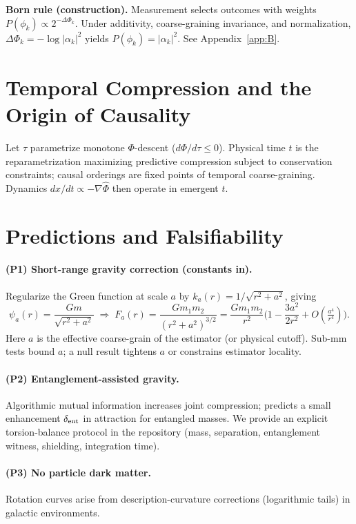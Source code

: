 \documentclass[aps,preprint,onecolumn,longbibliography,nofootinbib]{revtex4-2}
\numberwithin{equation}{section}        %
\begin{document}
\textbf{Born rule (construction).} Measurement selects outcomes with weights $P(\phi_k)\propto 2^{-\Delta\Phi_k}$. Under additivity, coarse-graining invariance, and normalization, $\Delta\Phi_k=-\log|\alpha_k|^2$ yields $P(\phi_k)=|\alpha_k|^2$. See Appendix~\ref{app:B}.

\section{Temporal Compression and the Origin of Causality}
Let $\tau$ parametrize monotone $\Phi$-descent ($d\Phi/d\tau\le 0$). Physical time $t$ is the reparametrization maximizing predictive compression subject to conservation constraints; causal orderings are fixed points of temporal coarse-graining. Dynamics $dx/dt\propto-\nabla\widehat\Phi$ then operate in emergent $t$.

\section{Predictions and Falsifiability}
\paragraph*{(P1) Short-range gravity correction (constants in).}
Regularize the Green function at scale $a$ by $k_a(r)=1/\sqrt{r^2+a^2}$, giving
\begin{equation}
\psi_a(r)=\frac{G m}{\sqrt{r^2+a^2}}
\;\Rightarrow\;
F_a(r)=\frac{G m_1 m_2}{(r^2+a^2)^{3/2}}
=\frac{G m_1 m_2}{r^2}\Big(1-\frac{3a^2}{2r^2}+O(\tfrac{a^4}{r^4})\Big). \label{eq:short}
\end{equation}
Here $a$ is the effective coarse-grain of the estimator (or physical cutoff). Sub-mm tests bound $a$; a null result tightens $a$ or constrains estimator locality.

\paragraph*{(P2) Entanglement-assisted gravity.}
Algorithmic mutual information increases joint compression; predicts a small enhancement $\delta_{\rm ent}$ in attraction for entangled masses. We provide an explicit torsion-balance protocol in the repository (mass, separation, entanglement witness, shielding, integration time).

\paragraph*{(P3) No particle dark matter.}
Rotation curves arise from description-curvature corrections (logarithmic tails) in galactic environments.
\end{document}
